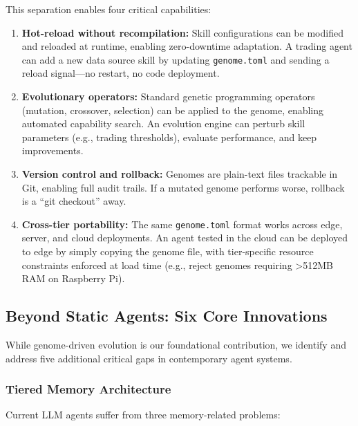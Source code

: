 \documentclass{article}
\newcommand{\genome}{\texttt{genome.toml}}
\begin{document}
This separation enables four critical capabilities:

\begin{enumerate}[leftmargin=*]
    \item \textbf{Hot-reload without recompilation:} Skill configurations can be modified and reloaded at runtime, enabling zero-downtime adaptation. A trading agent can add a new data source skill by updating \genome{} and sending a reload signal---no restart, no code deployment.
    
    \item \textbf{Evolutionary operators:} Standard genetic programming operators (mutation, crossover, selection) can be applied to the genome, enabling automated capability search. An evolution engine can perturb skill parameters (e.g., trading thresholds), evaluate performance, and keep improvements.
    
    \item \textbf{Version control and rollback:} Genomes are plain-text files trackable in Git, enabling full audit trails. If a mutated genome performs worse, rollback is a ``git checkout'' away.
    
    \item \textbf{Cross-tier portability:} The same \genome{} format works across edge, server, and cloud deployments. An agent tested in the cloud can be deployed to edge by simply copying the genome file, with tier-specific resource constraints enforced at load time (e.g., reject genomes requiring >512MB RAM on Raspberry Pi).
\end{enumerate}

\subsection{Beyond Static Agents: Six Core Innovations}

While genome-driven evolution is our foundational contribution, we identify and address five additional critical gaps in contemporary agent systems.

\subsubsection{Tiered Memory Architecture}

Current LLM agents suffer from three memory-related problems:
\end{document}
